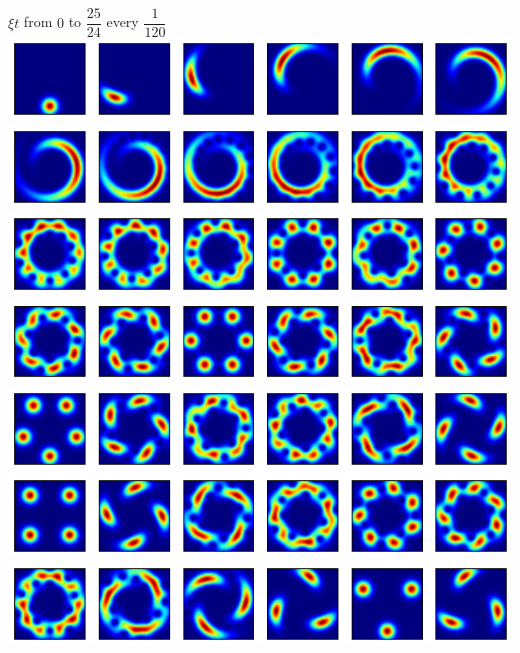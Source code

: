\documentclass[10pt,fleqn]{article}
\begin{document}
\subsection{}
$\xi t$ from $0$ to $\dfrac{25}{24}$ every $\dfrac1{120}$\\
\includegraphics[width=15cm]{3-5-0.png}\\
\includegraphics[width=15cm]{3-5-1.png}\\
\includegraphics[width=15cm]{3-5-2.png}\\
\includegraphics[width=15cm]{3-5-3.png}\\
\includegraphics[width=15cm]{3-5-4.png}\\
\includegraphics[width=15cm]{3-5-5.png}\\
\includegraphics[width=15cm]{3-5-6.png}\\
\end{document}
